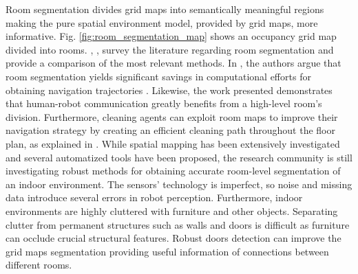 Room segmentation divides grid maps into semantically meaningful regions making the pure spatial environment model, provided by grid maps, more informative. Fig. \ref{fig:room_segmentation_map} shows an occupancy grid map divided into rooms. \citeauthor{segmentationsurvey}, \cite{segmentationsurvey}, survey the literature regarding room segmentation and provide a comparison of the most relevant methods. In \cite{segmenationfornavigation}, the authors argue that room segmentation yields significant savings in computational efforts for obtaining navigation trajectories . Likewise, the work presented \cite{segmentationhumanrobot} demonstrates that human-robot communication greatly benefits from a high-level room's division. Furthermore, cleaning agents can exploit room maps to improve their navigation strategy by creating an efficient cleaning path throughout the floor plan, as explained in \cite{segmentationcleaning}. While spatial mapping has been extensively investigated and several automatized tools have been proposed, the research community is still investigating robust methods for obtaining accurate room-level segmentation of an indoor environment. The sensors' technology is imperfect, so noise and missing data introduce several errors in robot perception. Furthermore, indoor environments are highly cluttered with furniture and other objects. Separating clutter from permanent structures such as walls and doors is difficult as furniture can occlude crucial structural features. Robust doors detection can improve the grid maps segmentation providing useful information of connections between different rooms.

